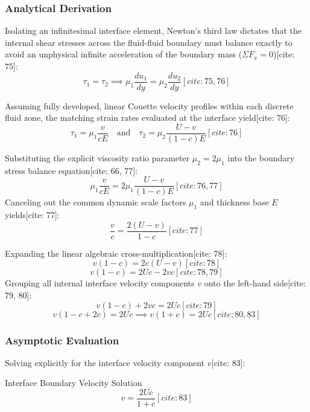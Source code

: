 \subsubsection{Analytical Derivation}
Isolating an infinitesimal interface element, Newton's third law dictates that the internal shear stresses across the fluid-fluid boundary must balance exactly to avoid an unphysical infinite acceleration of the boundary mass ($\Sigma F_x = 0$)[cite: 75]:
\begin{equation}
    \tau_1 = \tau_2 \implies \mu_1 \frac{du_1}{dy} = \mu_2 \frac{du_2}{dy} [cite: 75, 76]
\end{equation}

Assuming fully developed, linear Couette velocity profiles within each discrete fluid zone, the matching strain rates evaluated at the interface yield[cite: 76]:
\begin{equation}
    \tau_1 = \mu_1 \frac{v}{c E} \quad \text{and} \quad \tau_2 = \mu_2 \frac{U - v}{(1 - c) E} [cite: 76]
\end{equation}

Substituting the explicit viscosity ratio parameter $\mu_2 = 2\mu_1$ into the boundary stress balance equation[cite: 66, 77]:
\begin{equation}
    \mu_1 \frac{v}{c E} = 2\mu_1 \frac{U - v}{(1 - c) E} [cite: 76, 77]
\end{equation}
Canceling out the common dynamic scale factors $\mu_1$ and thickness base $E$ yields[cite: 77]:
\begin{equation}
    \frac{v}{c} = \frac{2(U - v)}{1 - c} [cite: 77]
\end{equation}

Expanding the linear algebraic cross-multiplication[cite: 78]:
\begin{equation}
    v(1 - c) = 2c(U - v) [cite: 78]
\end{equation}
\begin{equation}
    v(1 - c) = 2Uc - 2vc [cite: 78, 79]
\end{equation}
Grouping all internal interface velocity components $v$ onto the left-hand side[cite: 79, 80]:
\begin{equation}
    v(1 - c) + 2vc = 2Uc [cite: 79]
\end{equation}
\begin{equation}
    v(1 - c + 2c) = 2Uc \implies v(1 + c) = 2Uc [cite: 80, 83]
\end{equation}

\subsubsection{Asymptotic Evaluation}
Solving explicitly for the interface velocity component $v$[cite: 83]:
\begin{eqbox}{Interface Boundary Velocity Solution}
\begin{equation}
    v = \frac{2 U c}{1 + c} [cite: 83]
\end{equation}
\end{eqbox}

